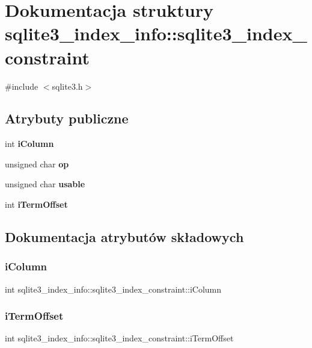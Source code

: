 \section{Dokumentacja struktury sqlite3\+\_\+index\+\_\+info\+::sqlite3\+\_\+index\+\_\+constraint}
\label{structsqlite3__index__info_1_1sqlite3__index__constraint}


{\ttfamily \#include $<$sqlite3.\+h$>$}

\subsection*{Atrybuty publiczne}
\begin{DoxyCompactItemize}
\item 
int \textbf{ i\+Column}
\item 
unsigned char \textbf{ op}
\item 
unsigned char \textbf{ usable}
\item 
int \textbf{ i\+Term\+Offset}
\end{DoxyCompactItemize}


\subsection{Dokumentacja atrybutów składowych}
\mbox{\label{structsqlite3__index__info_1_1sqlite3__index__constraint_a0f1e207060420058ee2881f2ea368e3a}} 
\subsubsection{iColumn}
{\footnotesize\ttfamily int sqlite3\+\_\+index\+\_\+info\+::sqlite3\+\_\+index\+\_\+constraint\+::i\+Column}

\mbox{\label{structsqlite3__index__info_1_1sqlite3__index__constraint_a4e8368da66f34b7f07b369984b813d1b}} 
\subsubsection{iTermOffset}
{\footnotesize\ttfamily int sqlite3\+\_\+index\+\_\+info\+::sqlite3\+\_\+index\+\_\+constraint\+::i\+Term\+Offset}

